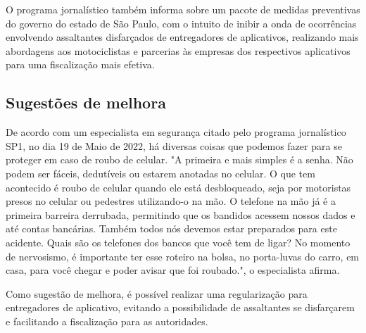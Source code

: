         O programa jornalístico também informa sobre um pacote de medidas preventivas
        do governo do estado de São Paulo, com o intuito de inibir a onda de ocorrências
        envolvendo assaltantes disfarçados de entregadores de aplicativos, realizando mais
        abordagens aos motociclistas e parcerias às empresas dos respectivos aplicativos para
        uma fiscalização mais efetiva.

    \subsection{Sugestões de melhora}

        De acordo com um especialista em segurança citado pelo programa jornalístico SP1, no dia 
        19 de Maio de 2022, há diversas coisas que podemos fazer para se proteger em caso de
        roubo de celular. "A primeira e mais simples é a senha. Não podem ser fáceis, dedutíveis
        ou estarem anotadas no celular. O que tem acontecido é roubo de celular quando ele está
        desbloqueado, seja por motoristas presos no celular ou pedestres utilizando-o na mão. O
        telefone na mão já é a primeira barreira derrubada, permitindo que os bandidos acessem
        nossos dados e até contas bancárias. Também todos nós devemos estar preparados para este 
        acidente. Quais são os telefones dos bancos que você tem de ligar? No momento de nervosismo,
        é importante ter esse roteiro na bolsa, no porta-luvas do carro, em casa, para você chegar
        e poder avisar que foi roubado.", o especialista afirma.

        Como sugestão de melhora, é possível realizar uma regularização para entregadores de
        aplicativo, evitando a possibilidade de assaltantes se disfarçarem e facilitando a
        fiscalização para as autoridades.